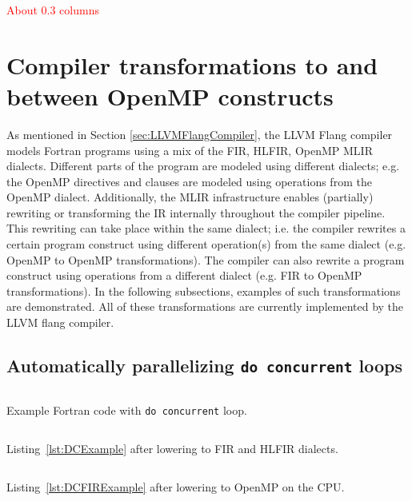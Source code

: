 \documentclass[acmtog,natbib=false]{acmart}
\newcommand{\todo}[1]{\textcolor{red}{#1}}
\newcommand{\code}[1]{\texttt{#1}\xspace}
\begin{document}
\todo{About 0.3 columns}


\section{Compiler transformations to and between OpenMP constructs}

As mentioned in Section \ref{sec:LLVMFlangCompiler}, the LLVM Flang compiler models Fortran programs using a mix of the \ac{FIR}, \ac{HLFIR}, OpenMP \ac{MLIR} dialects.
Different parts of the program are modeled using different dialects; e.g. the OpenMP directives and clauses are modeled using operations from the OpenMP dialect.
Additionally, the \ac{MLIR} infrastructure enables (partially) rewriting or transforming the IR internally throughout the compiler pipeline.
This rewriting can take place within the same dialect; i.e. the compiler rewrites a certain program construct using different operation(s) from the same dialect (e.g. OpenMP to OpenMP transformations).
The compiler can also rewrite a program construct using operations from a different dialect (e.g. \ac{FIR} to OpenMP transformations).
In the following subsections, examples of such transformations are demonstrated.
All of these transformations are currently implemented by the LLVM flang compiler.

\subsection{Automatically parallelizing \code{do concurrent} loops}

\begin{listing}[t]
\inputminted{Fortran}{code/dc_saxpy.f90}
\caption{Example Fortran code with \code{do concurrent} loop.}
\label{lst:DCExample}
\end{listing}

\begin{listing}[t]
\inputminted{MLIR-lexer.py:MlirLexer -x}{code/dc_fir.mlir}
\caption{Listing~\ref{lst:DCExample} after lowering to \ac{FIR} and \ac{HLFIR} dialects.}
\label{lst:DCFIRExample}
\end{listing}

\begin{listing}[t]
\inputminted{MLIR-lexer.py:MlirLexer -x}{code/dc_omp.mlir}
\caption{Listing~\ref{lst:DCFIRExample} after lowering to OpenMP on the CPU.}
\label{lst:DCOMPExample}
\end{listing}
\end{document}
